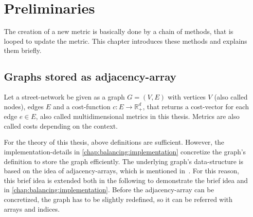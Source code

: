 \chapter{Preliminaries}
\label{chap:preliminaries}

The creation of a new metric is basically done by a chain of methods, that is looped to update the metric.
This chapter introduces these methods and explains them briefly.

\section{Graphs stored as adjacency-array}
\label{chap:preliminaries:graphs}

    Let a street-network be given as a graph $G = (V, E)$ with vertices $V$ (also called nodes), edges $E$ and a cost-function $c: E \to \mathbb{R}_+^d$, that returns a cost-vector for each edge $e \in E$, also called multidimensional metrics in this thesis.
    Metrics are also called costs depending on the context.

    For the theory of this thesis, above definitions are sufficient.
    However, the implementation-details in \cref{chap:balancing:implementation} concretize the graph's definition to store the graph efficiently.
    The underlying graph's data-structure is based on the idea of adjacency-arrays, which is mentioned in~\cite{mehlhorn:algorithms}.
    For this reason, this brief idea is extended both in the following to demonstrate the brief idea and in \cref{chap:balancing:implementation}.
    Before the adjacency-array can be concretized, the graph has to be slightly redefined, so it can be referred with arrays and indices.

